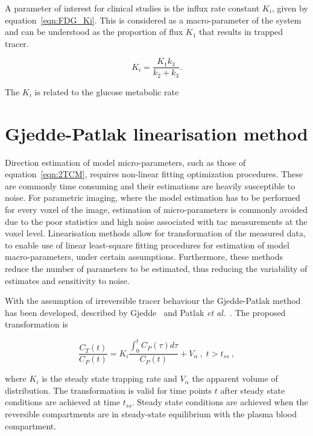 A parameter of interest for clinical studies is the influx rate constant $K_i$, given by equation~\ref{eqn:FDG_Ki}. This is considered as a macro-parameter of the system and can be understood as the proportion of flux $K_1$ that results in trapped tracer.

\begin{equation}
K_i = \frac{K_1 k_3}{k_2+k_3} . 
\label{eqn:FDG_Ki}
\end{equation}

The $K_i$ is related to the glucose metabolic rate 

\section{Gjedde-Patlak linearisation method}
Direction estimation of model micro-parameters, such as those of equation~\ref{eqn:2TCM}, requires non-linear fitting optimization procedures. These are commonly time consuming and their estimations are heavily susceptible to noise.
For parametric imaging, where the model estimation has to be performed for every voxel of the image, estimation of micro-parameters is commonly avoided due to the poor statistics and high noise associated with \gls{tac} measurements at the voxel level. 
Linearisation methods allow for transformation of the measured data, to enable use of linear least-square fitting procedures for estimation of model macro-parameters, under certain assumptions. Furthermore, these methods reduce the number of parameters to be estimated, thus reducing the variability of estimates and sensitivity to noise. 

With the assumption of irreversible tracer behaviour the Gjedde-Patlak method has been developed, described by Gjedde~\cite{Gjedde1982} and Patlak \textit{et al.}~\cite{Patlak1985}. The proposed transformation is

\begin{equation}
\label{eqn:PatlakModel}
\frac{C_{T}(t)}{C_{P}(t)} = K_i \frac{\int_{0}^{t} C_{P}(\tau) d\tau}{ C_{P}(t)} + V_{\alpha}   \ , \;  t>t_{ss} \ ,
\end{equation}

where $K_i$ is the steady state trapping rate and $V_{\alpha}$ the apparent volume of distribution. The transformation is valid for time points $t$ after steady state conditions are achieved at time $t_{ss}$. Steady state conditions are achieved when the reversible compartments are in steady-state equilibrium with the plasma blood compartment. 

